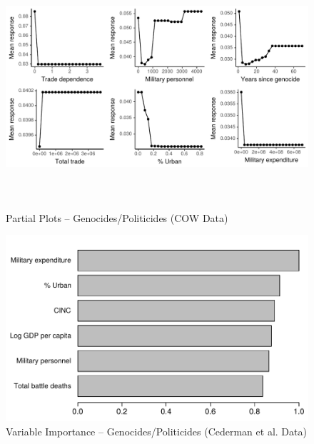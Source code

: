 \begin{figure}[H]
    \centering
    \includegraphics[width=\textwidth, height=9cm]{images/drfdpp6a.pdf}
    \caption{Partial Plots -- Genocides/Politicides (COW Data)}
    \label{fig:my_label}
\end{figure}

\begin{figure}[H]
    \centering
    \includegraphics{images/drf-gp3.pdf}
    \caption{Variable Importance -- Genocides/Politicides (Cederman et al. Data)}
    \label{fig:my_label}
\end{figure}

